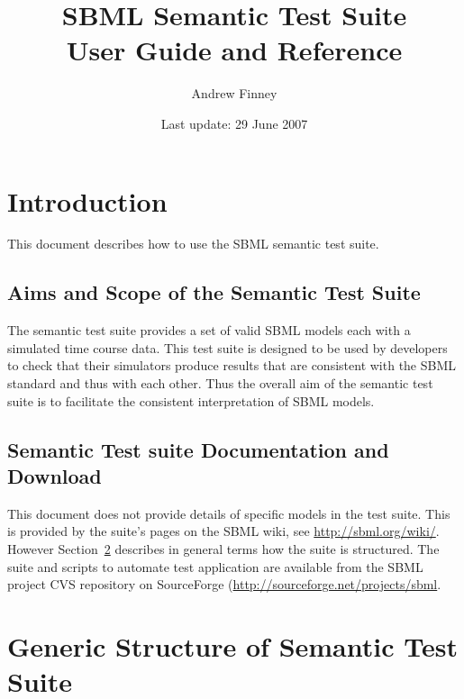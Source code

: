 \documentclass{cekarticle}
\begin{document}

\title{SBML Semantic Test Suite\\User Guide and Reference}

\author{Andrew Finney}


\date{Last update: 29 June 2007}

\maketitlepage

\section{Introduction}
\label{sec:introduction}

This document describes how to use the SBML semantic test suite.

\subsection{Aims and Scope of the Semantic Test Suite}

The semantic test suite provides a set of valid SBML models each
with a simulated time course data.  This test suite is designed to
be used by developers to check that their simulators produce
results that are consistent with the SBML standard and thus with
each other.  Thus the overall aim of the semantic test suite is to
facilitate the consistent interpretation of SBML models.

\subsection{Semantic Test suite Documentation and Download}

This document does not provide details of specific models in the
test suite. This is provided by the suite's pages on the SBML
wiki, see \url{http://sbml.org/wiki/}. However
Section~\ref{sec:structure} describes in general terms how the
suite is structured.  The suite and scripts to automate test
application are available from the SBML project CVS repository
on SourceForge (\url{http://sourceforge.net/projects/sbml}.

\section{Generic Structure of Semantic Test Suite}
\label{sec:structure}
\end{document}
